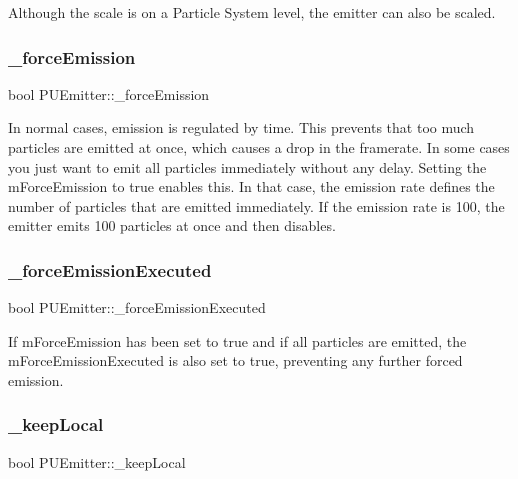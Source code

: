 Although the scale is on a Particle System level, the emitter can also be scaled. \mbox{\label{classPUEmitter_adad1e10b1e1c001a5acd7b92934717b1}} 
\subsubsection{\texorpdfstring{\+\_\+force\+Emission}{\_forceEmission}}
{\footnotesize\ttfamily bool P\+U\+Emitter\+::\+\_\+force\+Emission\hspace{0.3cm}{\ttfamily [protected]}}

In normal cases, emission is regulated by time. This prevents that too much particles are emitted at once, which causes a drop in the framerate. In some cases you just want to emit all particles immediately without any delay. Setting the \textquotesingle{}m\+Force\+Emission\textquotesingle{} to true enables this. In that case, the emission rate defines the number of particles that are emitted immediately. If the emission rate is 100, the emitter emits 100 particles at once and then disables. \mbox{\label{classPUEmitter_ae1f45f6e268cf9e89456443d31103987}} 
\subsubsection{\texorpdfstring{\+\_\+force\+Emission\+Executed}{\_forceEmissionExecuted}}
{\footnotesize\ttfamily bool P\+U\+Emitter\+::\+\_\+force\+Emission\+Executed\hspace{0.3cm}{\ttfamily [protected]}}

If m\+Force\+Emission has been set to true and if all particles are emitted, the m\+Force\+Emission\+Executed is also set to true, preventing any further \textquotesingle{}forced emission\textquotesingle{}. \mbox{\label{classPUEmitter_a332fe167b26fab8642a2e5ab9a5e0b9f}} 
\subsubsection{\texorpdfstring{\+\_\+keep\+Local}{\_keepLocal}}
{\footnotesize\ttfamily bool P\+U\+Emitter\+::\+\_\+keep\+Local\hspace{0.3cm}{\ttfamily [protected]}}

